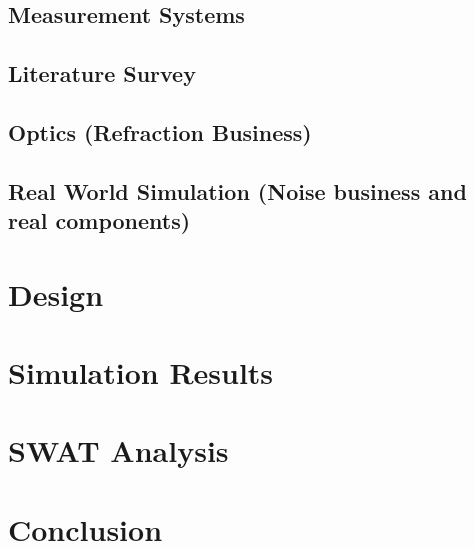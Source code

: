 \documentclass[conference, 11pt]{IEEEtran}
\begin{document}
	\subsection{Measurement Systems}
	
	\subsection{Literature Survey}
	
	\subsection{Optics (Refraction Business)}
	
	\subsection{Real World Simulation (Noise business and real components)}
	

\section{Design}

\section{Simulation Results}

\section{SWAT Analysis}


\section{Conclusion}
\end{document}
